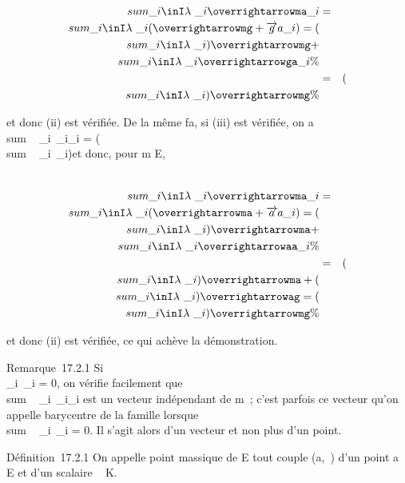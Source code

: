 \documentclass[]{article}
\begin{document}
\begin{align*} \\sum
\_i\inI\lambda~\_i\overrightarrowma\_i&
=& \\sum
\_i\inI\lambda~\_i(\overrightarrowmg
+\overrightarrow ga\_i) =
(\\sum
\_i\inI\lambda~\_i)\overrightarrowmg +
\\sum
\_i\inI\lambda~\_i\overrightarrowga\_i\%&
\\ & =& (\\sum
\_i\inI\lambda~\_i)\overrightarrowmg \%&
\\ \end{align*}

et donc (ii) est vérifiée. De la même fa\ccon, si
(iii) est vérifiée, on a
\\sum ~
\_i\inI\lambda~\_i\overrightarrowaa\_i =
(\\sum ~
\_i\inI\lambda~\_i)\overrightarrowag et donc,
pour m \in E,

\begin{align*} \\sum
\_i\inI\lambda~\_i\overrightarrowma\_i&
=& \\sum
\_i\inI\lambda~\_i(\overrightarrowma
+\overrightarrow aa\_i) =
(\\sum
\_i\inI\lambda~\_i)\overrightarrowma +
\\sum
\_i\inI\lambda~\_i\overrightarrowaa\_i\%&
\\ & =& (\\sum
\_i\inI\lambda~\_i)\overrightarrowma +
(\\sum
\_i\inI\lambda~\_i)\overrightarrowag =
(\\sum
\_i\inI\lambda~\_i)\overrightarrowmg \%&
\\ \end{align*}

et donc (ii) est vérifiée, ce qui achève la démonstration.

Remarque~17.2.1 Si \\\sum
 \_i\inI\lambda~\_i = 0, on vérifie facilement que
\\sum ~
\_i\inI\lambda~\_i\overrightarrowma\_i
est un vecteur \vecu indépendant de m~; c'est parfois
ce vecteur qu'on appelle barycentre de la famille lorsque
\\sum ~
\_i\inI\lambda~\_i = 0. Il s'agit alors d'un vecteur et non plus
d'un point.

Définition~17.2.1 On appelle point massique de E tout couple (a,\lambda~) d'un
point a \in E et d'un scalaire \lambda~ \in K.
\end{document}
